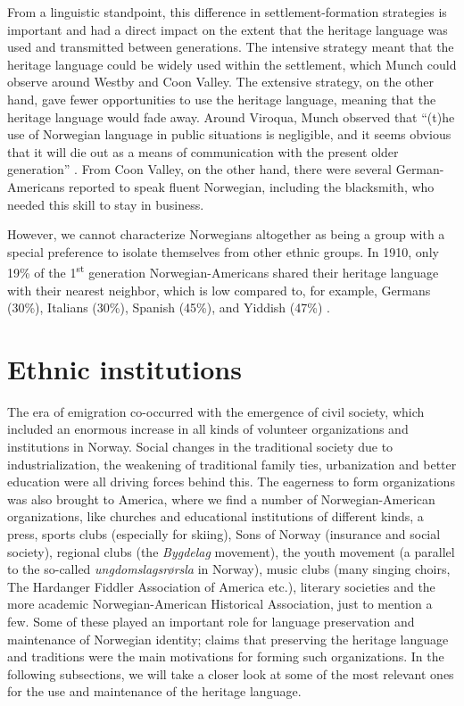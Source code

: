\documentclass[output=paper]{langscibook}
\begin{document}
From a linguistic standpoint, this difference in settlement-formation strategies is important and had a direct impact on the extent that the heritage language was used and transmitted between generations. The intensive strategy meant that the heritage language could be widely used within the settlement, which Munch could observe around Westby and Coon Valley. The extensive strategy, on the other hand, gave fewer opportunities to use the heritage language, meaning that the heritage language would fade away. Around Viroqua, Munch observed that “(t)he use of Norwegian language in public situations is negligible, and it seems obvious that it will die out as a means of communication with the present older generation” \citep[784]{Munch1949}. From Coon Valley, on the other hand, there were several German\hyp Americans reported to speak fluent Norwegian, including the blacksmith, who needed this skill to stay in business. 

However, we cannot characterize Norwegians altogether as being a group with a special preference to isolate themselves from other ethnic groups. In 1910, only 19\% of the 1\textsuperscript{st} generation Norwegian\hyp Americans shared their heritage language with their nearest neighbor, which is low compared to, for example, Germans (30\%), Italians (30\%), Spanish (45\%), and Yiddish (47\%) \citep[388]{Labov1998}. 

\section{Ethnic institutions}\label{sec:hjelde:6}

The era of emigration co-occurred with the emergence of civil society, which included an enormous increase in all kinds of volunteer organizations and institutions in Norway. Social changes in the traditional society due to industrialization, the weakening of traditional family ties, urbanization and better education were all driving forces behind this. The eagerness to form organizations was also brought to America, where we find a number of Norwegian\hyp American organizations, like churches and educational institutions of different kinds, a press, sports clubs (especially for skiing), Sons of Norway (insurance and social society), regional clubs (the \textit{Bygdelag} movement), the youth movement (a parallel to the so-called \textit{ungdomslagsrørsla} in Norway), music clubs (many singing choirs, The Hardanger Fiddler Association of America etc.), literary societies and the more academic Norwegian\hyp American Historical Association, just to mention a few. Some of these played an important role for language preservation and maintenance of Norwegian identity; \citet[179]{Lovoll1984} claims that preserving the heritage language and traditions were the main motivations for forming such organizations. In the following subsections, we will take a closer look at some of the most relevant ones for the use and maintenance of the heritage language.
\end{document}
